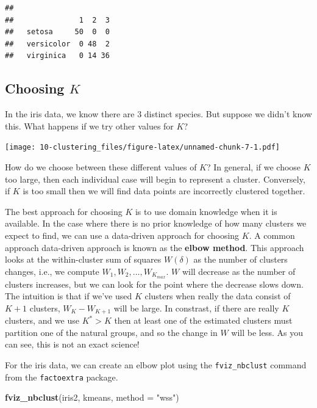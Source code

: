 \documentclass[
]{book}
\newenvironment{Shaded}{\begin{snugshade}}{\end{snugshade}}
\newcommand{\AttributeTok}[1]{\textcolor[rgb]{0.13,0.29,0.53}{#1}}
\newcommand{\FunctionTok}[1]{\textcolor[rgb]{0.13,0.29,0.53}{\textbf{#1}}}
\newcommand{\NormalTok}[1]{#1}
\newcommand{\StringTok}[1]{\textcolor[rgb]{0.31,0.60,0.02}{#1}}
\theoremstyle{definition}
\theoremstyle{definition}
\theoremstyle{definition}
\theoremstyle{definition}
\theoremstyle{remark}
\begin{document}
\begin{verbatim}
##             
##               1  2  3
##   setosa     50  0  0
##   versicolor  0 48  2
##   virginica   0 14 36
\end{verbatim}

\hypertarget{choosing-k}{%
\subsection{\texorpdfstring{Choosing \(K\)}{Choosing K}}\label{choosing-k}}

In the iris data, we know there are 3 distinct species. But suppose we didn't know this. What happens if we try other values for \(K\)?

\texttt{[image: 10-clustering\_files/figure-latex/unnamed-chunk-7-1.pdf]}

How do we choose between these different values of \(K\)?
In general, if we choose \(K\) too large, then each individual case will begin to represent a cluster. Conversely, if \(K\) is too small then we will find data points are incorrectly clustered together.

The best approach for choosing \(K\) is to use domain knowledge when it is available. In the case where there is no prior knowledge of how many clusters we expect to find, we can use a data-driven approach for choosing \(K\).
A common approach data-driven approach is known as the \textbf{elbow method}. This approach looks at the within-cluster sum of squares \(W(\delta)\) as the number of clusters changes, i.e., we compute \(W_1, W_2, \ldots, W_{K_{max}}\). \(W\) will decrease as the number of clusters increases, but we can look for the point where the decrease slows down. The intuition is that if we've used \(K\) clusters when really the data consist of \(K+1\) clusters, \(W_K-W_{K+1}\) will be large. In constrast, if there are really \(K\) clusters, and we use \(K^*>K\) then at least one of the estimated clusters must partition one of the natural groups, and so the change in \(W\) will be less. As you can see, this is not an exact science!

For the iris data, we can create an elbow plot using the \texttt{fviz\_nbclust} command from the \texttt{factoextra} package.

\begin{Shaded}
\begin{Highlighting}[]
\FunctionTok{fviz\_nbclust}\NormalTok{(iris2, kmeans, }\AttributeTok{method =} \StringTok{"wss"}\NormalTok{)}
\end{Highlighting}
\end{Shaded}
\end{document}
